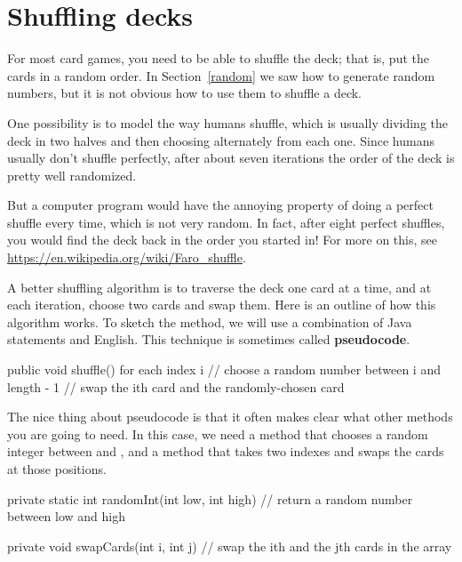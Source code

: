 \section{Shuffling decks}
\label{shuffle}


For most card games, you need to be able to shuffle the deck; that is, put the cards in a random order.
In Section~\ref{random} we saw how to generate random numbers, but it is not obvious how to use them to shuffle a deck.

One possibility is to model the way humans shuffle, which is usually dividing the deck in two halves and then choosing alternately from each one.
Since humans usually don't shuffle perfectly, after about seven iterations the order of the deck is pretty well randomized.

But a computer program would have the annoying property of doing a perfect shuffle every time, which is not very random.
In fact, after eight perfect shuffles, you would find the deck back in the order you started in!
For more on this, see \url{https://en.wikipedia.org/wiki/Faro_shuffle}.


A better shuffling algorithm is to traverse the deck one card at a time, and at each iteration, choose two cards and swap them.
Here is an outline of how this algorithm works.
To sketch the method, we will use a combination of Java statements and English.
This technique is sometimes called {\bf pseudocode}.


\begin{code}
public void shuffle() {
    for each index i {
        // choose a random number between i and length - 1
        // swap the ith card and the randomly-chosen card
    }
}
\end{code}


The nice thing about pseudocode is that it often makes clear what other methods you are going to need.
In this case, we need a method that chooses a random integer between  and , and a method that takes two indexes and swaps the cards at those positions.

\begin{code}
private static int randomInt(int low, int high) {
    // return a random number between low and high
}

private void swapCards(int i, int j) {
    // swap the ith and the jth cards in the array
}
\end{code}

